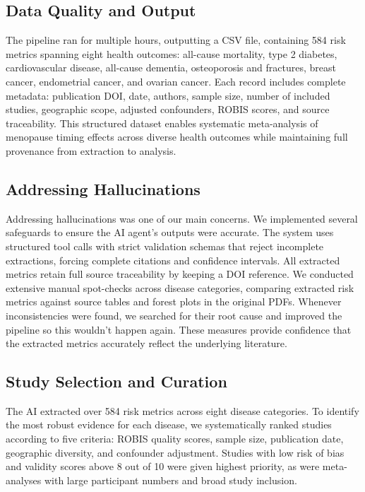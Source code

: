 \documentclass[12pt]{article}
\begin{document}
\subsection{Data Quality and Output}
The pipeline ran for multiple hours, outputting a CSV file, containing 584 risk metrics spanning eight health outcomes: all-cause mortality, type 2 diabetes, cardiovascular disease, all-cause dementia, osteoporosis and fractures, breast cancer, endometrial cancer, and ovarian cancer. Each record includes complete metadata: publication DOI, date, authors, sample size, number of included studies, geographic scope, adjusted confounders, ROBIS scores, and source traceability. This structured dataset enables systematic meta-analysis of menopause timing effects across diverse health outcomes while maintaining full provenance from extraction to analysis.

\subsection{Addressing Hallucinations}
Addressing hallucinations was one of our main concerns. We implemented several safeguards to ensure the AI agent's outputs were accurate. The system uses structured tool calls with strict validation schemas that reject incomplete extractions, forcing complete citations and confidence intervals. All extracted metrics retain full source traceability by keeping a DOI reference. We conducted extensive manual spot-checks across disease categories, comparing extracted risk metrics against source tables and forest plots in the original PDFs. Whenever inconsistencies were found, we searched for their root cause and improved the pipeline so this wouldn't happen again. These measures provide confidence that the extracted metrics accurately reflect the underlying literature.

\subsection{Study Selection and Curation}
The AI extracted over 584 risk metrics across eight disease categories. To identify the most robust evidence for each disease, we systematically ranked studies according to five criteria: ROBIS quality scores, sample size, publication date, geographic diversity, and confounder adjustment. Studies with low risk of bias and validity scores above 8 out of 10 were given highest priority, as were meta-analyses with large participant numbers and broad study inclusion.
\end{document}
